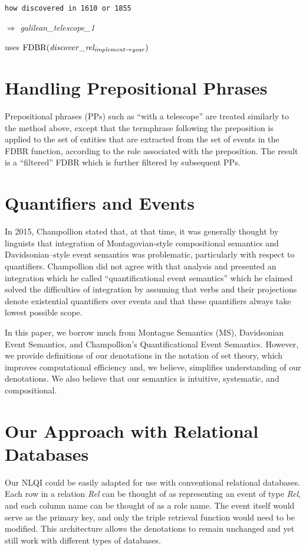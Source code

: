 \documentclass[../main.tex]{subfiles}
\begin{document}
\begin{refsection}
\noindent \texttt{how discovered in 1610 or 1855}

$\Rightarrow$  \textit{galilean\_telescope\_1}

uses $\mathrm{FDBR}({\mathit{discover\_rel_{implement \rightarrow year}}})$

\section{Handling Prepositional Phrases}

Prepositional phrases (PPs) such as ``with a telescope'' are treated
similarly to the method above, except that the termphrase
following the preposition is applied to the set of entities that are extracted from
the set of events in the FDBR function, according to the role associated with
the preposition. The result is a ``filtered'' FDBR which is further filtered by
subsequent PPs.

\section{Quantifiers and Events}
\label{webist2019conf:quant}
In 2015, Champollion \cite{champollion2015interaction} stated that, at that time, it was generally thought by linguists that integration of Montagovian-style compositional semantics and Davidsonian–style event semantics \cite{parsons1990events,davidson1967logical} was problematic, particularly with respect to quantifiers. Champollion did not agree with that analysis and presented an integration which he called ``quantificational event semantics'' which he claimed solved the difficulties of integration by assuming that verbs and their projections denote existential quantifiers over events and that these quantifiers always take lowest possible scope.

In this paper, we borrow much from Montague Semantics (MS), Davidsonian Event Semantics,
and Champollion's Quantificational Event Semantics. However, we provide definitions of our
denotations in the notation of set theory, which improves computational efficiency and, we
believe, simplifies understanding of our denotations. We also believe that our semantics is
intuitive, systematic, and compositional.

\section{Our Approach with Relational Databases}

Our NLQI could be easily adapted for use with conventional relational databases.
Each row in a relation \textit{Rel} can be thought of as representing an event of type \textit{Rel}, and each column name can be thought of as a role name.  The event itself would serve as the primary key, and only the triple retrieval function would need to be modified.  This architecture allows the denotations to remain unchanged and yet still work with different types of databases.


\end{refsection}
\end{document}
